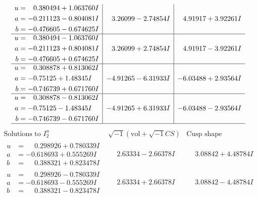\documentclass[1p]{elsarticle_modified}
\theoremstyle{definition}
\newcommand{\I}{\sqrt{-1}}
\begin{document}
$$\begin{array}{c|c|c}
\begin{aligned}
u &= \phantom{-}0.380494 + 1.063760 I \\
a &= -0.211123 - 0.804081 I \\
b &= -0.476605 - 0.674625 I\end{aligned}
 & \phantom{-}3.26099 - 2.74854 I & \phantom{-}4.91917 + 3.92261 I \\ \hline\begin{aligned}
u &= \phantom{-}0.380494 - 1.063760 I \\
a &= -0.211123 + 0.804081 I \\
b &= -0.476605 + 0.674625 I\end{aligned}
 & \phantom{-}3.26099 + 2.74854 I & \phantom{-}4.91917 - 3.92261 I \\ \hline\begin{aligned}
u &= \phantom{-}0.308878 + 0.813062 I \\
a &= -0.75125 + 1.48345 I \\
b &= -0.746739 + 0.671760 I\end{aligned}
 & -4.91265 - 6.31933 I & -6.03488 + 2.93564 I \\ \hline\begin{aligned}
u &= \phantom{-}0.308878 - 0.813062 I \\
a &= -0.75125 - 1.48345 I \\
b &= -0.746739 - 0.671760 I\end{aligned}
 & -4.91265 + 6.31933 I & -6.03488 - 2.93564 I\\
 \hline 
 \end{array}$$\newpage$$\begin{array}{c|c|c}  
\text{Solutions to }I^u_{2}& \I (\text{vol} + \sqrt{-1}CS) & \text{Cusp shape}\\
 \hline 
\begin{aligned}
u &= \phantom{-}0.298926 + 0.780339 I \\
a &= -0.618693 + 0.555269 I \\
b &= \phantom{-}0.388321 + 0.823478 I\end{aligned}
 & \phantom{-}2.63334 - 2.66378 I & \phantom{-}3.08842 + 4.48784 I \\ \hline\begin{aligned}
u &= \phantom{-}0.298926 - 0.780339 I \\
a &= -0.618693 - 0.555269 I \\
b &= \phantom{-}0.388321 - 0.823478 I\end{aligned}
 & \phantom{-}2.63334 + 2.66378 I & \phantom{-}3.08842 - 4.48784 I \\ \hline\begin{aligned}

\end{aligned}
\end{array}$$
\end{document}
